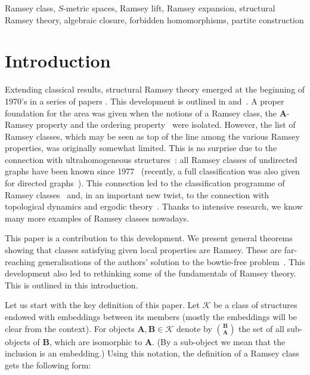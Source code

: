 \documentclass{elsarticle}
\def\str#1{\mathbf {#1}}
\def\K{{\mathcal K}}
\theoremstyle{plain}
\theoremstyle{definition}
\theoremstyle{remark}
\begin{document}
\begin{frontmatter}
\begin{abstract}
We also characterise Ramsey lifts of classes of structures defined by finitely
many forbidden homomorphisms and extend this to special cases of classes with
closures.  This has numerous applications.  For example, we find Ramsey lifts
of many Cherlin--Shelah--Shi classes.
\end{abstract}
\begin{keyword}
Ramsey class, $S$-metric spaces, Ramsey lift, Ramsey expansion, structural Ramsey theory, algebraic closure, forbidden homomorphisms, partite construction
\end{keyword}
\end{frontmatter}
\eject
\tableofcontents
\clearpage
\section {Introduction}
Extending classical results, structural Ramsey theory emerged at
the beginning of 1970's in a series of papers
\cite{Graham1971,Graham1972,Nevsetvril1976,Halpern1966,Abramson1978,Milliken1979}.
This development is outlined in \cite{Graham1990} and~\cite{Nevsetvril1995}. A proper foundation for the area was given when
the notions of a Ramsey class, the $\str{A}$-Ramsey property and the ordering
property~\cite{Leeb,Nevsetvril1976} were isolated.  However, the list of Ramsey classes, which
may be seen as top of the line among the various Ramsey properties, was originally somewhat limited. This is no surprise due to the connection with ultrahomogeneous structures~\cite{Nevsetvril1989a}: all Ramsey classes of undirected graphs have been known since 1977~\cite{Nevsetvril1977} (recently, a full classification was also given for directed graphs~\cite{Jasinski2013}). This connection led to the classification
programme of Ramsey classes~\cite{Nevsetril2005} and, in an important new twist, to the connection with topological dynamics and ergodic theory~\cite{Kechris2005}. Thanks to intensive research, we know many more examples of Ramsey classes nowadays.

This paper is a contribution to this development. We present general theorems showing that classes satisfying given local properties are Ramsey. These are far-reaching generalisations of the authors' solution to the bowtie-free problem~\cite{Hubivcka2014}. This development also led to rethinking some of the fundamentals of Ramsey theory. This is outlined in this introduction.

Let us start with the key definition of this paper.  Let $\K$ be a class of structures endowed with embeddings between its members (mostly the embeddings will be clear from the context). For objects $\str{A},\str{B}\in \K$ denote by ${\str{B}\choose \str{A}}$ the set of all sub-objects of $\str{B}$, which are isomorphic to $\str{A}$. (By a sub-object we mean that the inclusion is an embedding.) Using this notation, the definition of a Ramsey class gets the following form:
\end{document}

